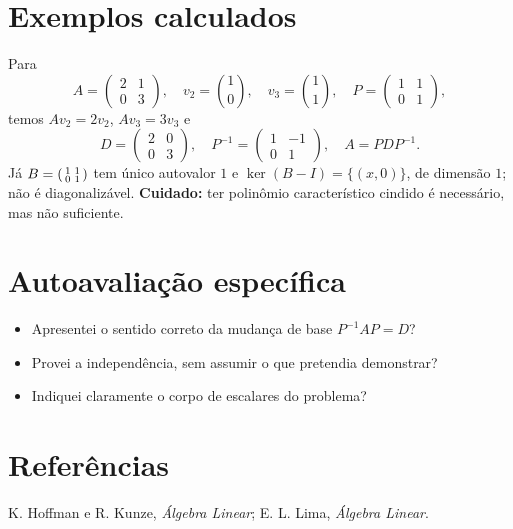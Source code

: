 \documentclass[11pt,a4paper]{article}
\begin{document}
\section{Exemplos calculados}
Para
\[
A=\begin{pmatrix}2&1\\0&3\end{pmatrix},\quad
v_2=\binom10,\quad v_3=\binom11,\quad
P=\begin{pmatrix}1&1\\0&1\end{pmatrix},
\]
temos $Av_2=2v_2$, $Av_3=3v_3$ e
\[
D=\begin{pmatrix}2&0\\0&3\end{pmatrix},\quad
P^{-1}=\begin{pmatrix}1&-1\\0&1\end{pmatrix},\quad A=PDP^{-1}.
\]
Já $B=\begin{psmallmatrix}1&1\\0&1\end{psmallmatrix}$ tem único autovalor $1$ e $\ker(B-I)=\{(x,0)\}$, de dimensão $1$; não é diagonalizável. \textbf{Cuidado:} ter polinômio característico cindido é necessário, mas não suficiente.
\section{Autoavaliação específica}
\begin{itemize}
\item Apresentei o sentido correto da mudança de base $P^{-1}AP=D$?
\item Provei a independência, sem assumir o que pretendia demonstrar?
\item Indiquei claramente o corpo de escalares do problema?
\end{itemize}
\RubricaUFMT
\section{Referências}
K. Hoffman e R. Kunze, \emph{Álgebra Linear}; E. L. Lima, \emph{Álgebra Linear}.
\end{document}
